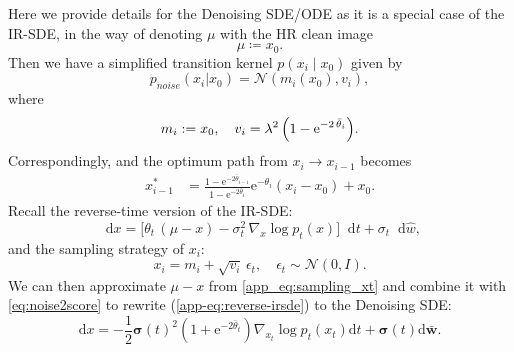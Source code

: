\documentclass{article}
\newcommand{\diff}{\mathop{}\!\mathrm{d}}
\newcommand{\expp}{\mathrm{e}}
\newcommand{\cond}{{\;|\;}}
\theoremstyle{plain}
\theoremstyle{definition}
\theoremstyle{remark}
\begin{document}
Here we provide details for the Denoising SDE/ODE as it is a special case of the IR-SDE, in the way of denoting $\mu$ with the HR clean image
\begin{equation}
    \mu \coloneqq {x}_0.
    \label{app-eq:denoise_mu}
\end{equation}
Then we have a simplified transition kernel $p({x}_i \cond {x}_0)$ given by
\begin{equation}
    p_{noise}({x}_i|{x}_0) = \mathcal{N}(m_i({x}_0), v_i),
    \label{app-eq:denoise_transition}
\end{equation}
where
\begin{equation}
    m_i := {x}_0, \quad v_i = \lambda^2 \, \Bigl(1 - \expp^{-2 \, \bar{\theta}_{i}}\Bigr).
\end{equation}
Correspondingly, and the optimum path from ${x}_i \rightarrow {x}_{i-1}$ becomes
\begin{equation}
    \begin{split}
        {x}_{i-1}^{*} &= \frac{1 - \mathrm{e}^{-2\bar{{\theta}}_{i-1}}}{1 - \mathrm{e}^{-2\bar{{\theta}}_{i}}} \mathrm{e}^{-{{\theta}}_{i}} ({x}_i - {x}_0) + {x}_0.
    \end{split}
    \label{app-eq:optimal_denoising_trajectory}
\end{equation}
Recall the reverse-time version of the IR-SDE:
\begin{equation}
    \diff {x} = \big[ \theta_t \, (\mu - {x}) - \sigma_t^2 \, \nabla_{{x}} \log p_t({x}) \big] \diff t + \sigma_t \diff \hat{w},
    \label{app-eq:reverse-irsde}
\end{equation}
and the sampling strategy of ${x}_i$:
\begin{equation}
    {x}_i = m_{i} + \sqrt{v_{i}} \, \epsilon_t, \quad  \epsilon_t \sim \mathcal{N}(0, I).
\label{app_eq:sampling_xt}
\end{equation}
We can then approximate $\mu - {x}$ from \eqref{app_eq:sampling_xt} and combine it with \eqref{eq:noise2score} to rewrite (\ref{app-eq:reverse-irsde}) to the Denoising SDE:
\begin{equation}
    {\mathrm d}{x} = -\frac{1}{2}\bm{\sigma}(t)^2 (1 + \mathrm{e}^{-2\bar{{\theta}}_t}) \nabla_{{x}_t}\log p_t({x}_t){\mathrm d}t + \bm{\sigma}(t){\mathrm d}\bar{\mathbf w}.
    \label{app-eq:denoising-sde-simple}
\end{equation}
\end{document}
